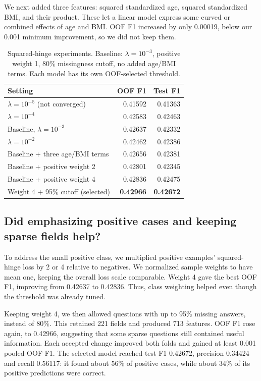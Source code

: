 \documentclass[10pt,conference,compsocconf,a4paper]{latex-example-paper/IEEEtran}
\begin{document}
We next added three features: squared standardized age, squared
standardized BMI, and their product. These let a linear model express
some curved or combined effects of age and BMI. OOF F1 increased by only
0.00019, below our 0.001 minimum improvement, so we did not keep them.

\begin{table}[t]
\centering
\caption{Squared-hinge experiments. Baseline: $\lambda=10^{-3}$,
positive weight 1, 80\% missingness cutoff, no added age/BMI terms.
Each model has its own OOF-selected threshold.}
\label{tab:stages}
\begin{tabular}{@{}lrr@{}}
\toprule
Setting & OOF F1 & Test F1 \\
\midrule
$\lambda=10^{-5}$ (not converged) & 0.41592 & 0.41363 \\
$\lambda=10^{-4}$ & 0.42583 & 0.42463 \\
Baseline, $\lambda=10^{-3}$ & 0.42637 & 0.42332 \\
$\lambda=10^{-2}$ & 0.42462 & 0.42386 \\
Baseline + three age/BMI terms & 0.42656 & 0.42381 \\
Baseline + positive weight 2 & 0.42801 & 0.42345 \\
Baseline + positive weight 4 & 0.42836 & 0.42475 \\
Weight 4 + 95\% cutoff (selected) & \textbf{0.42966} & \textbf{0.42672} \\
\bottomrule
\end{tabular}
\end{table}

\subsection{Did emphasizing positive cases and keeping sparse fields help?}
To address the small positive class, we multiplied positive examples'
squared-hinge loss by 2 or 4 relative to negatives. We normalized sample
weights to have mean one, keeping the overall loss scale comparable.
Weight 4 gave the best OOF F1, improving from 0.42637 to 0.42836.
Thus, class weighting helped even though the threshold was already tuned.

Keeping weight 4, we then allowed questions with up to 95\% missing
answers, instead of 80\%. This retained 221 fields and produced 713
features. OOF F1 rose again, to 0.42966, suggesting that some sparse
questions still contained useful information. Each accepted change improved both folds and gained at least 0.001
pooled OOF F1.
The selected model reached test F1 0.42672, precision 0.34424 and recall
0.56117: it found about 56\% of positive cases, while about 34\% of its
positive predictions were correct.
\end{document}
